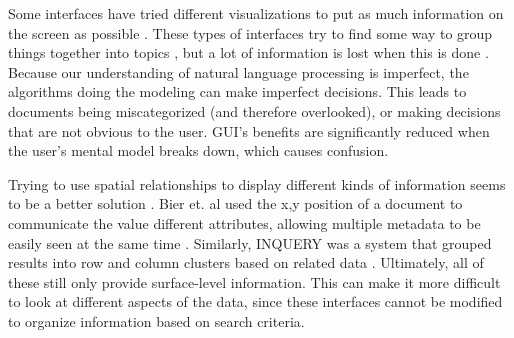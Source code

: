 \documentclass{article}
\begin{document}
Some interfaces have tried different visualizations to put as much information on the screen as possible \cite{Newman2010} \cite{Nowell1996} \cite{Shneiderman2000} \cite{Yost2006}.  These types of interfaces try to find some way to group things together into topics \cite{Newman2010}, but a lot of information is lost when this is done \cite{Nowell1996}.  Because our understanding of natural language processing is imperfect, the algorithms doing the modeling can make imperfect decisions.  This leads to documents being miscategorized (and therefore overlooked), or making decisions that are not obvious to the user.  GUI's benefits are significantly reduced when the user's mental model breaks down, which causes confusion.  

Trying to use spatial relationships to display different kinds of information seems to be a better solution \cite{Bier2005} \cite{Foo2007:ECDL} \cite{Foo2007:ICADL} \cite{Mothe1998}.   Bier et. al used the x,y position of a document to communicate the value different attributes, allowing multiple metadata to be easily seen at the same time \cite{Bier2005}.  %
Similarly, INQUERY was a system that grouped results into row and column clusters based on related data \cite{Mothe1998}.  Ultimately, all of these still only provide surface-level information.  This can make it more difficult to look at different aspects of the data, since these interfaces cannot be modified to organize information based on search criteria.
 

\end{document}
